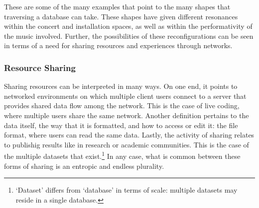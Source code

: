	These are some of the many examples that point to the many shapes that traversing a database can take. These shapes have given different resonances within the concert and installation spaces, as well as within the performativity of the music involved. Further, the possibilities of these reconfigurations can be seen in terms of a need for sharing resources and experiences through networks.

\subsubsection{Resource Sharing}

	Sharing resources can be interpreted in many ways. On one end, it points to networked environments on which multiple client users connect to a server that provides shared data flow among the network. This is the case of live coding, where multiple users share the same network. Another definition pertains to the data itself, the way that it is formatted, and how to access or edit it: the file format, where users can read the same data. Lastly, the activity of sharing relates to publishig results like in research or academic communities. This is the case of the multiple datasets that exist.\footnote{`Dataset' differs from `database' in terms of scale: multiple datasets may reside in a single database.} In any case, what is common between these forms of sharing is an entropic and endless plurality.

